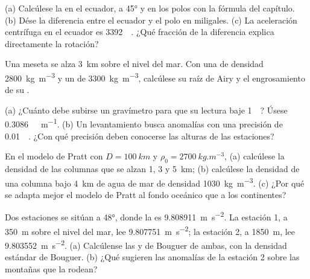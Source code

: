 \begin{exercise}[$\star$]\label{exo:b1:isostasy-gravity:2}
(a) Calcúlese la  en el ecuador, a \ang{45} y en los polos con la fórmula del capítulo. (b) Dése la diferencia entre
el ecuador y el polo en miligales. (c) La aceleración centrífuga en el ecuador es \qty{3392}{\milli\gal}. ¿Qué fracción de la
diferencia explica directamente la rotación?
\end{exercise}

\begin{exercise}[$\star$]\label{exo:b1:isostasy-gravity:3}
Una meseta se alza \qty{3}{km} sobre el nivel del mar. Con una  de densidad \qty{2800}{kg.m^{-3}} y un  de
\qty{3300}{kg.m^{-3}}, calcúlese su raíz de Airy y el engrosamiento de su .
\end{exercise}

\begin{exercise}[$\star$]\label{exo:b1:isostasy-gravity:4}
(a) ¿Cuánto debe subirse un gravímetro para que su lectura baje \qty{1}{\milli\gal}? Úsese \qty{0.3086}{\milli\gal.m^{-1}}. (b) Un
levantamiento busca anomalías con una precisión de \qty{0.01}{\milli\gal}. ¿Con qué precisión deben conocerse las alturas de las
estaciones?
\end{exercise}

\begin{exercise}[$\star\star$]\label{exo:b1:isostasy-gravity:5}
En el modelo de Pratt con $D = \qty{100}{km}$ y $\rho_0 = \qty{2700}{kg.m^{-3}}$, (a) calcúlese la densidad de las columnas que se
alzan 1, 3 y \qty{5}{km}; (b) calcúlese la densidad de una columna bajo \qty{4}{km} de agua de mar de densidad
\qty{1030}{kg.m^{-3}}. (c) ¿Por qué se adapta mejor el modelo de Pratt al fondo oceánico que a los continentes?
\end{exercise}

\begin{exercise}[$\star\star$]\label{exo:b1:isostasy-gravity:6}
Dos estaciones se sitúan a  \ang{48}, donde la  es \qty{9.808911}{m.s^{-2}}. La estación 1, a \qty{350}{m} sobre
el nivel del mar, lee \qty{9.807751}{m.s^{-2}}; la estación 2, a \qty{1850}{m}, lee \qty{9.803552}{m.s^{-2}}. (a) Calcúlense las
 y de Bouguer de ambas, con la densidad estándar de Bouguer. (b) ¿Qué sugieren las anomalías de la estación 2
sobre las montañas que la rodean?
\end{exercise}

